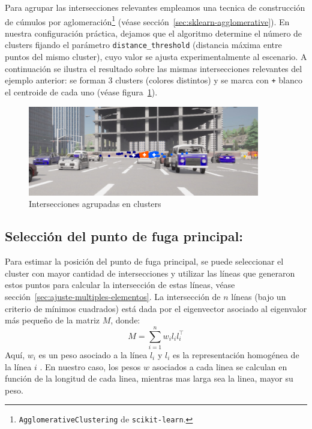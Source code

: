 Para agrupar las intersecciones relevantes empleamos una tecnica de construcción de cúmulos por aglomeración\footnote{\texttt{AgglomerativeClustering} de \texttt{scikit-learn}.} (véase sección~\ref{sec:sklearn-agglomerative}). En nuestra configuración práctica, dejamos que el algoritmo determine el número de clusters fijando el parámetro \texttt{distance\_threshold} (distancia máxima entre puntos del mismo cluster), cuyo valor se ajusta experimentalmente al escenario. A continuación se ilustra el resultado sobre las mismas intersecciones relevantes del ejemplo anterior: se forman 3 clusters (colores distintos) y se marca con \texttt{+} blanco el centroide de cada uno (véase figura~\ref{fig:clusters}).
\begin{figure}[!ht]
    \centering
    \includegraphics[width=0.9\textwidth]{img/reticule/AgglomerativeClustering}
    \caption{Intersecciones agrupadas en clusters}
    \label{fig:clusters}
\end{figure}



\subsection{Selección del punto de fuga principal:}

Para estimar la posición del punto de fuga principal, se puede seleccionar el cluster con mayor cantidad de intersecciones y
utilizar las líneas que generaron estos puntos para calcular la intersección de estas líneas, véase sección~\ref{sec:ajuste-multiples-elementos}.
La intersección de $n$ líneas (bajo un criterio de mínimos cuadrados) está dada por el eigenvector asociado al eigenvalor más pequeño de la matriz $M$, donde:
\[
    M = \sum_{i=1}^{n} w_i l_i l_i^\top
\]
Aquí, $w_i$ es un peso asociado a la línea $l_i$ y $l_i$ es la representación homogénea de la línea $i$ \cite{kanatani1998statistical}. En nuestro caso, los pesos $w$ asociados a cada linea se calculan en función de la longitud de cada linea, mientras mas larga sea la linea, mayor su peso.

